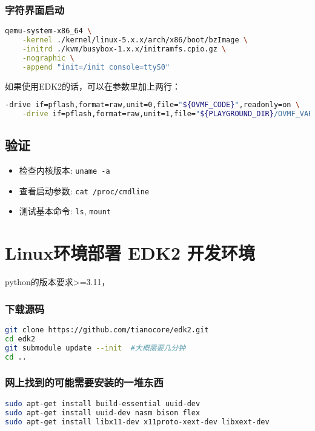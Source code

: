 \subsubsection{字符界面启动}
\begin{lstlisting}[language=bash, showstringspaces=false]
qemu-system-x86_64 \
    -kernel ./kernel/linux-5.x.x/arch/x86/boot/bzImage \
    -initrd ./kvm/busybox-1.x.x/initramfs.cpio.gz \
    -nographic \
    -append "init=/init console=ttyS0"
\end{lstlisting}
如果使用EDK2的话，可以在参数里加上两行：
\begin{lstlisting}[language=bash]
    -drive if=pflash,format=raw,unit=0,file="${OVMF_CODE}",readonly=on \
    -drive if=pflash,format=raw,unit=1,file="${PLAYGROUND_DIR}/OVMF_VARS.fd" \
\end{lstlisting}

\subsection{验证}
\begin{itemize}
    \item 检查内核版本: \texttt{uname -a}
    \item 查看启动参数: \texttt{cat /proc/cmdline}
    \item 测试基本命令: \texttt{ls}, \texttt{mount}
\end{itemize}

\section{Linux环境部署 EDK2 开发环境}

python的版本要求>=3.11，

\subsubsection{下载源码}
\begin{lstlisting}[language=bash]
git clone https://github.com/tianocore/edk2.git
cd edk2
git submodule update --init  #大概需要几分钟
cd ..
\end{lstlisting}

\subsubsection{网上找到的可能需要安装的一堆东西} \label{compile-edk2}

\begin{lstlisting}[language=bash]
sudo apt-get install build-essential uuid-dev
sudo apt-get install uuid-dev nasm bison flex
sudo apt-get install libx11-dev x11proto-xext-dev libxext-dev
\end{lstlisting}

